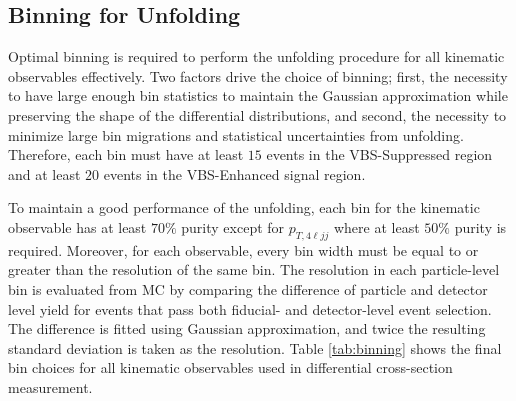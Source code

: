 \subsection{Binning for Unfolding}
\label{subsec:Binning}
Optimal binning is required to perform the unfolding procedure for all kinematic observables effectively. Two factors drive the choice of binning; first, the necessity to have large enough bin statistics to maintain the Gaussian approximation while preserving the shape of the differential distributions, and second, the necessity to minimize large bin migrations and statistical uncertainties from unfolding. Therefore, each bin must have at least $15$ events in the VBS-Suppressed region and at least $20$ events in the VBS-Enhanced signal region. 

To maintain a good performance of the unfolding, each bin for the kinematic observable has at least $70\%$ purity except for $p_{T,4\ell jj}$ where at least $50\%$ purity is required. Moreover, for each observable, every bin width must be equal to or greater than the resolution of the same bin. The resolution in each particle-level bin is evaluated from MC by comparing the difference of particle and detector level yield for events that pass both fiducial- and detector-level event selection. The difference is fitted using Gaussian approximation, and twice the resulting standard deviation is taken as the resolution. Table \ref{tab:binning} shows the final bin choices for all kinematic observables used in differential cross-section measurement.

